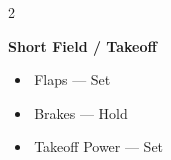 \documentclass[10pt]{article}
\newcommand{\checkbox}{\raisebox{0.0ex}{\fbox{\rule{0pt}{1.25ex}\rule{1.25ex}{0pt}}}\,}
\begin{document}
\begin{multicols}{2}
\vspace{1mm}
\begin{sectbox}
  {\scriptsize\textbf{Short Field / Takeoff}}
\end{sectbox}
\vspace{1mm}
\begin{itemize}[left=0pt,label={},labelsep=2mm]
  \item \checkbox {\scriptsize Flaps --- Set}
  \item \checkbox {\scriptsize Brakes --- Hold}
  \item \checkbox {\scriptsize Takeoff Power --- Set}
\end{itemize}

\vfill
\end{multicols}
\end{document}
